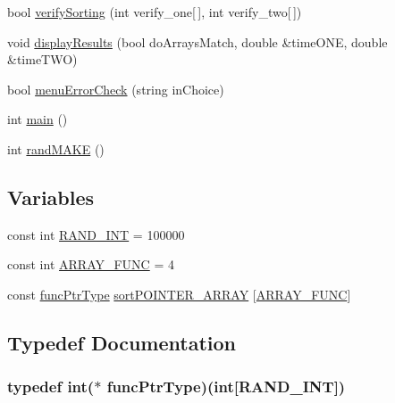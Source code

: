 \begin{DoxyCompactItemize}
\item 
bool \hyperlink{_delouth_mansfield-_assn4_8cpp_ae2cf0cca1e089e83ae98750b96b8cf11}{verifySorting} (int verify\_\-one\mbox{[}$\,$\mbox{]}, int verify\_\-two\mbox{[}$\,$\mbox{]})
\item 
void \hyperlink{_delouth_mansfield-_assn4_8cpp_a95da63b4a266243c36e025d0fcc6b757}{displayResults} (bool doArraysMatch, double \&timeONE, double \&timeTWO)
\item 
bool \hyperlink{_delouth_mansfield-_assn4_8cpp_a3fcd92b059e256a9f46866c6d1e2b1e4}{menuErrorCheck} (string inChoice)
\item 
int \hyperlink{_delouth_mansfield-_assn4_8cpp_ae66f6b31b5ad750f1fe042a706a4e3d4}{main} ()
\item 
int \hyperlink{_delouth_mansfield-_assn4_8cpp_a191743d28b671610e8d78df14b41ed9e}{randMAKE} ()
\end{DoxyCompactItemize}
\subsection*{Variables}
\begin{DoxyCompactItemize}
\item 
const int \hyperlink{_delouth_mansfield-_assn4_8cpp_a134c2ba56ae9ba89c77a5c0dba9f2124}{RAND\_\-INT} = 100000
\item 
const int \hyperlink{_delouth_mansfield-_assn4_8cpp_a3b95dd60d5c45f7cc3733769f3d54868}{ARRAY\_\-FUNC} = 4
\item 
const \hyperlink{_delouth_mansfield-_assn4_8cpp_ae2987d0004dea58df8c833858c0fb370}{funcPtrType} \hyperlink{_delouth_mansfield-_assn4_8cpp_ae039780346621e190c7726c08c9a1a13}{sortPOINTER\_\-ARRAY} \mbox{[}\hyperlink{_delouth_mansfield-_assn4_8cpp_a3b95dd60d5c45f7cc3733769f3d54868}{ARRAY\_\-FUNC}\mbox{]}
\end{DoxyCompactItemize}


\subsection{Typedef Documentation}
\hypertarget{_delouth_mansfield-_assn4_8cpp_ae2987d0004dea58df8c833858c0fb370}{
\subsubsection[{funcPtrType}]{\setlength{\rightskip}{0pt plus 5cm}typedef int($\ast$ {\bf funcPtrType})(int\mbox{[}{\bf RAND\_\-INT}\mbox{]})}}
\label{_delouth_mansfield-_assn4_8cpp_ae2987d0004dea58df8c833858c0fb370}



